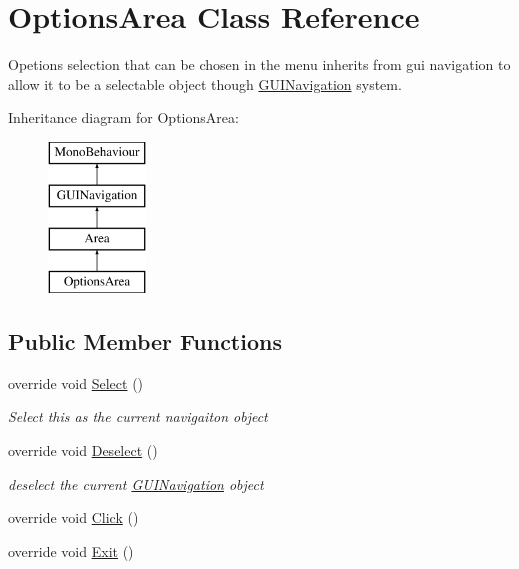 \hypertarget{class_options_area}{}\section{Options\+Area Class Reference}
\label{class_options_area}


Opetions selection that can be chosen in the menu inherits from gui navigation to allow it to be a selectable object though \mbox{\hyperlink{class_g_u_i_navigation}{G\+U\+I\+Navigation}} system.  


Inheritance diagram for Options\+Area\+:\begin{figure}[H]
\begin{center}
\leavevmode
\includegraphics[height=4.000000cm]{class_options_area}
\end{center}
\end{figure}
\subsection*{Public Member Functions}
\begin{DoxyCompactItemize}
\item 
override void \mbox{\hyperlink{class_options_area_a2dc4be3a6a17378055632ac3d0c124e7}{Select}} ()
\begin{DoxyCompactList}\small\item\em Select this as the current navigaiton object \end{DoxyCompactList}\item 
override void \mbox{\hyperlink{class_options_area_abecd9cd9d7c96ae63dde5110cce7c364}{Deselect}} ()
\begin{DoxyCompactList}\small\item\em deselect the current \mbox{\hyperlink{class_g_u_i_navigation}{G\+U\+I\+Navigation}} object \end{DoxyCompactList}\item 
override void \mbox{\hyperlink{class_options_area_a1ee78382652a273de4911c8a2894ee36}{Click}} ()
\item 
override void \mbox{\hyperlink{class_options_area_a8a38de01790a717037f8c3aae3e83b85}{Exit}} ()
\end{DoxyCompactItemize}
